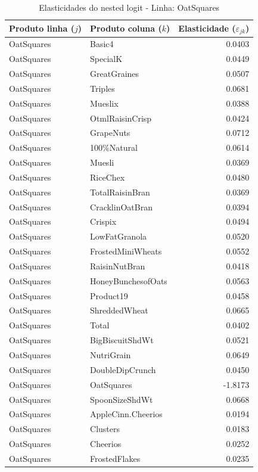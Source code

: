 \begingroup
\begin{table}[H]
\centering
\caption{Elasticidades do nested logit - Linha: OatSquares}
\label{tab:elas-nested-oatsquares}
\small
\begin{tabular}{llr}
\toprule
Produto linha ($j$) & Produto coluna ($k$) & Elasticidade ($\varepsilon_{jk}$) \\
\midrule
OatSquares & Basic4 & 0.0403 \\
OatSquares & SpecialK & 0.0449 \\
OatSquares & GreatGraines & 0.0507 \\
OatSquares & Triples & 0.0681 \\
OatSquares & Mueslix & 0.0388 \\
OatSquares & OtmlRaisinCrisp & 0.0424 \\
OatSquares & GrapeNuts & 0.0712 \\
OatSquares & 100\%Natural & 0.0614 \\
OatSquares & Muesli & 0.0369 \\
OatSquares & RiceChex & 0.0480 \\
OatSquares & TotalRaisinBran & 0.0369 \\
OatSquares & CracklinOatBran & 0.0394 \\
OatSquares & Crispix & 0.0494 \\
OatSquares & LowFatGranola & 0.0520 \\
OatSquares & FrostedMiniWheats & 0.0552 \\
OatSquares & RaisinNutBran & 0.0418 \\
OatSquares & HoneyBunchesofOats & 0.0563 \\
OatSquares & Product19 & 0.0458 \\
OatSquares & ShreddedWheat & 0.0665 \\
OatSquares & Total & 0.0402 \\
OatSquares & BigBiscuitShdWt & 0.0521 \\
OatSquares & NutriGrain & 0.0649 \\
OatSquares & DoubleDipCrunch & 0.0450 \\
OatSquares & OatSquares & -1.8173 \\
OatSquares & SpoonSizeShdWt & 0.0668 \\
OatSquares & AppleCinn.Cheerios & 0.0194 \\
OatSquares & Clusters & 0.0183 \\
OatSquares & Cheerios & 0.0252 \\
OatSquares & FrostedFlakes & 0.0235 \\

\end{tabular}
\end{table}
